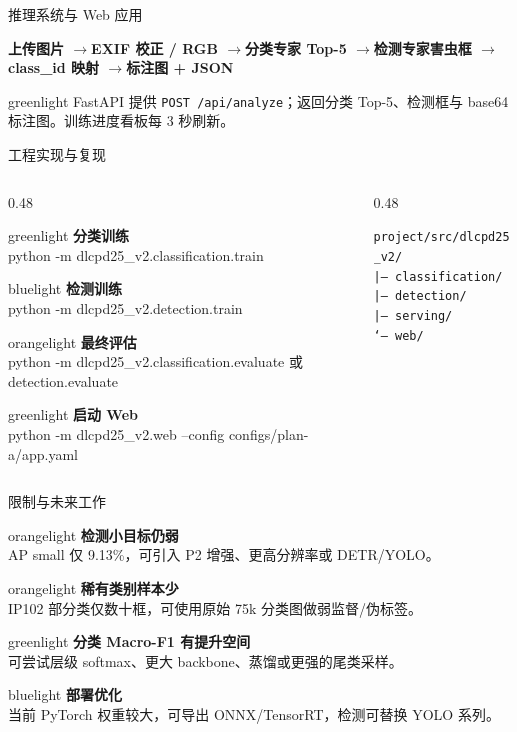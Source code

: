 \documentclass[aspectratio=169,10pt]{ctexbeamer}
\newcommand{\carditem}[3]{%
  \begin{card}{#3}
    \textbf{#1}\\[1pt] {\color{muted}\small #2}
  \end{card}}
\begin{document}
\begin{frame}{推理系统与 Web 应用}
\begin{center}
\small\bfseries
上传图片 \quad$\rightarrow$\quad EXIF 校正 / RGB \quad$\rightarrow$\quad 分类专家 Top-5 \quad$\rightarrow$\quad 检测专家害虫框 \quad$\rightarrow$\quad class\_id 映射 \quad$\rightarrow$\quad 标注图 + JSON
\end{center}
\vspace{3mm}
\begin{card}{greenlight}
FastAPI 提供 \texttt{POST /api/analyze}；返回分类 Top-5、检测框与 base64 标注图。训练进度看板每 3 秒刷新。
\end{card}
\end{frame}

\begin{frame}{工程实现与复现}
\begin{columns}[T]
\begin{column}{0.48\textwidth}
\carditem{分类训练}{python -m dlcpd25\_v2.classification.train}{greenlight}
\vspace{2mm}
\carditem{检测训练}{python -m dlcpd25\_v2.detection.train}{bluelight}
\vspace{2mm}
\carditem{最终评估}{python -m dlcpd25\_v2.classification.evaluate 或 detection.evaluate}{orangelight}
\vspace{2mm}
\carditem{启动 Web}{python -m dlcpd25\_v2.web --config configs/plan-a/app.yaml}{greenlight}
\end{column}
\begin{column}{0.48\textwidth}
\begin{tcolorbox}[colback=navy, colframe=navy, arc=2mm, top=2mm, bottom=2mm, left=3mm, right=3mm]
\color{white}\footnotesize
\texttt{project/src/dlcpd25\_v2/}\\[1mm]
\texttt{|-- classification/}\\[1mm]
\texttt{|-- detection/}\\[1mm]
\texttt{|-- serving/}\\[1mm]
\texttt{`-- web/}
\end{tcolorbox}
\end{column}
\end{columns}
\end{frame}

\begin{frame}{限制与未来工作}
\carditem{检测小目标仍弱}{AP small 仅 9.13\%，可引入 P2 增强、更高分辨率或 DETR/YOLO。}{orangelight}
\vspace{2mm}
\carditem{稀有类别样本少}{IP102 部分类仅数十框，可使用原始 75k 分类图做弱监督/伪标签。}{orangelight}
\vspace{2mm}
\carditem{分类 Macro-F1 有提升空间}{可尝试层级 softmax、更大 backbone、蒸馏或更强的尾类采样。}{greenlight}
\vspace{2mm}
\carditem{部署优化}{当前 PyTorch 权重较大，可导出 ONNX/TensorRT，检测可替换 YOLO 系列。}{bluelight}
\end{frame}
\end{document}
